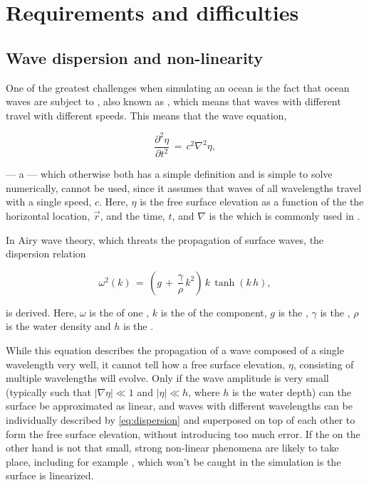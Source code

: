 \chapter{Requirements and difficulties}
\label{chap:requirementsanddifficulties}

\section{Wave dispersion and non-linearity}

One of the greatest challenges when simulating an ocean is the fact that ocean waves are subject to , also known as , which means that waves with different \wavelengths travel with different speeds. This means that the wave equation,

\begin{equation} \label{eq:wave_equation}
\frac{\partial^2 \eta}{\partial t^2} \,=\, c^2\nabla^2\eta,
\end{equation}

--- a \PDE\xspace --- which otherwise both has a simple definition and is simple to solve numerically, cannot be used, since it assumes that waves of all wavelengths travel with a single speed, $c$. Here, $\eta$ is the free surface elevation as a function of the the horizontal location, $\vec{r}$, and the time, $t$, and $\nabla$ is the  which is commonly used in .

In Airy wave theory, which threats the propagation of surface waves, the dispersion relation

\begin{equation} \label{eq:dispersion}
\omega^2(k) \,=\, \left(g\,+\,\frac{\gamma}{\rho}\,k^2\right)\,k\,\tanh(k\,h),
\end{equation}

is derived. Here, $\omega$ is the  of one , $k$ is the  of the component, $g$ is the , $\gamma$ is the , $\rho$ is the water density and $h$ is the .

While this equation describes the propagation of a wave composed of a single wavelength very well, it cannot tell how a free surface elevation, $\eta$, consisting of multiple wavelengths will evolve. Only if the wave amplitude is very small (typically such that $|\nabla\eta| \ll 1$ and $|\eta| \ll h$, where $h$ is the water depth) can the surface be approximated as linear, and waves with different wavelengths can be individually described by \eqref{eq:dispersion} and superposed on top of each other to form the free surface elevation, without introducing too much error. If the  on the other hand is not that small, strong non-linear phenomena are likely to take place, including for example , which won't be caught in the simulation is the surface is linearized.


